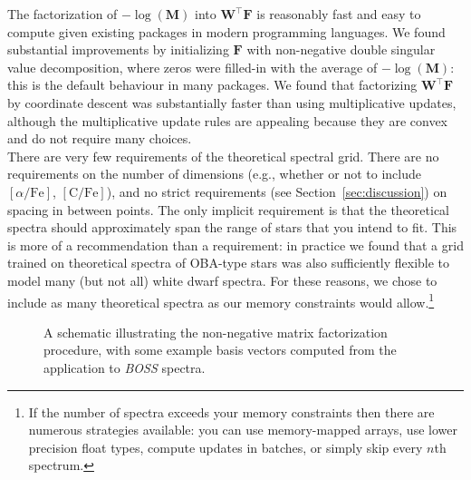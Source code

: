\documentclass[modern]{aastex631}
\renewcommand{\vec}[1]{\mathbf{#1}}
\newcommand{\vecpsi}{\boldsymbol{\psi}}
\newcommand{\vecW}{\mathbf{W}}
\newcommand{\vecH}{\mathbf{H}}
\newcommand{\transpose}{^\top}
\begin{document}
The factorization of $-\log\left({\vec{M}}\right)$ into $\vec{W}\transpose\vec{F}$ is reasonably fast and easy to compute given existing packages in modern programming languages. We found substantial improvements by initializing $\vec{F}$ with non-negative double singular value decomposition, where zeros were filled-in with the average of $-\log\left({\vec{M}}\right)$: this is the default behaviour in many packages. We found that factorizing $\vec{W}\transpose\vec{F}$ by coordinate descent was substantially faster than using multiplicative updates, although the multiplicative update rules are appealing because they are convex and do not require many choices.\\

There are very few requirements of the theoretical spectral grid. There are no requirements on the number of dimensions (e.g., whether or not to include $[\alpha/\mathrm{Fe}]$, $[\mathrm{C/Fe}]$), and no strict requirements (see Section~\ref{sec:discussion}) on spacing in between points. The only implicit requirement is that the theoretical spectra should approximately span the range of stars that you intend to fit. This is more of a recommendation than a requirement: in practice we found that a grid trained on theoretical spectra of OBA-type stars was also sufficiently flexible to model many (but not all) white dwarf spectra. For these reasons, we chose to include as many theoretical spectra as our memory constraints would allow.\footnote{If the number of spectra exceeds your memory constraints then there are numerous strategies available: you can use memory-mapped arrays, use lower precision float types, compute updates in batches, or simply skip every $n$th spectrum.}\\


\begin{figure*}
    \caption{A schematic illustrating the non-negative matrix factorization procedure, with some example basis vectors computed from the application to \emph{BOSS} spectra. \label{fig:schematic}}
\end{figure*}



\end{document}
